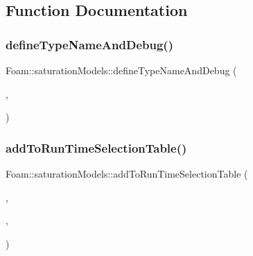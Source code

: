 \subsection{Function Documentation}
\mbox{\label{namespaceFoam_1_1saturationModels_a3811c12490cabc1f76da0e6e2205d4a1}} 
\subsubsection{\texorpdfstring{define\+Type\+Name\+And\+Debug()}{defineTypeNameAndDebug()}\hspace{0.1cm}{\footnotesize\ttfamily [1/4]}}
{\footnotesize\ttfamily Foam\+::saturation\+Models\+::define\+Type\+Name\+And\+Debug (\begin{DoxyParamCaption}\item[{\hyperlink{classFoam_1_1saturationModels_1_1BrowningPotter}{Browning\+Potter}}]{,  }\item[{0}]{ }\end{DoxyParamCaption})}

\mbox{\label{namespaceFoam_1_1saturationModels_af4c428227cb77a832cdecd8c807e03dd}} 
\subsubsection{\texorpdfstring{add\+To\+Run\+Time\+Selection\+Table()}{addToRunTimeSelectionTable()}\hspace{0.1cm}{\footnotesize\ttfamily [1/4]}}
{\footnotesize\ttfamily Foam\+::saturation\+Models\+::add\+To\+Run\+Time\+Selection\+Table (\begin{DoxyParamCaption}\item[{\hyperlink{classFoam_1_1saturationModel}{saturation\+Model}}]{,  }\item[{\hyperlink{classFoam_1_1saturationModels_1_1BrowningPotter}{Browning\+Potter}}]{,  }\item[{saturation\+Models}]{ }\end{DoxyParamCaption})}


